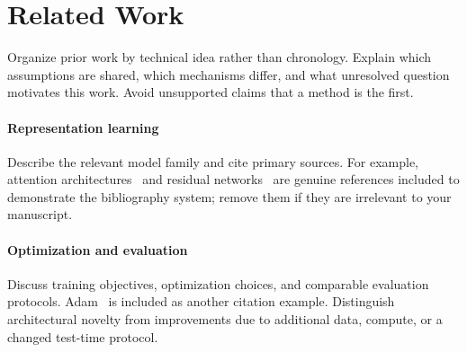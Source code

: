 \section{Related Work}\label{sec:related}
Organize prior work by technical idea rather than chronology. Explain which
assumptions are shared, which mechanisms differ, and what unresolved question
motivates this work. Avoid unsupported claims that a method is the first.

\paragraph{Representation learning}
Describe the relevant model family and cite primary sources. For example,
attention architectures~\citep{vaswani2017attention} and residual
networks~\citep{he2016deep} are genuine references included to demonstrate the
bibliography system; remove them if they are irrelevant to your manuscript.

\paragraph{Optimization and evaluation}
Discuss training objectives, optimization choices, and comparable evaluation
protocols. Adam~\citep{kingma2015adam} is included as another citation example.
Distinguish architectural novelty from improvements due to additional data,
compute, or a changed test-time protocol.
